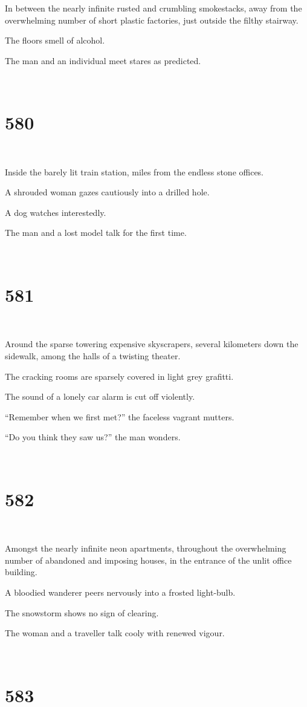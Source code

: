 \documentclass{report}
\begin{document}
In between the nearly infinite rusted and crumbling smokestacks, away from the overwhelming number of short plastic factories, just outside the filthy stairway.

The floors smell of alcohol.

The man and an individual meet stares as predicted.

~
\chapter*{580}
~

Inside the barely lit train station, miles from the endless stone offices.

A shrouded woman gazes cautiously into a drilled hole.

A dog watches interestedly.

The man and a lost model talk for the first time.

~
\chapter*{581}
~

Around the sparse towering expensive skyscrapers, several kilometers down the sidewalk, among the halls of a twisting theater.

The cracking rooms are sparsely covered in light grey grafitti.

The sound of a lonely car alarm is cut off violently.

``Remember when we first met?'' the faceless vagrant mutters.

``Do you think they saw us?'' the man wonders.

~
\chapter*{582}
~

Amongst the nearly infinite neon apartments, throughout the overwhelming number of abandoned and imposing houses, in the entrance of the unlit office building.

A bloodied wanderer peers nervously into a frosted light-bulb.

The snowstorm shows no sign of clearing.

The woman and a traveller talk cooly with renewed vigour.

~
\chapter*{583}
~
\end{document}
